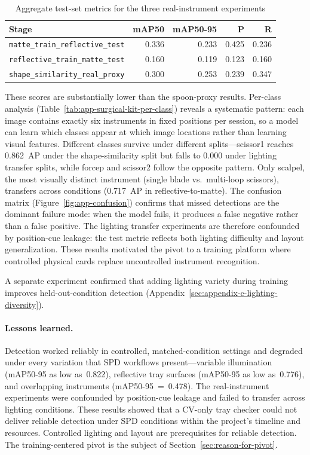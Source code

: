 \documentclass[10pt,a4paper]{article}
\begin{document}
\begin{table}[H]
\centering
\caption{Aggregate test-set metrics for the three real-instrument experiments}
\label{tab:surgical-kit-stage-metrics}
\small\renewcommand{\arraystretch}{1.2}\setlength{\tabcolsep}{4pt}
\begin{tabularx}{\textwidth}{lrrrr}
\hline
Stage & mAP50 & mAP50-95 & P & R \\
\hline
\texttt{matte\_train\_reflective\_test} & 0.336 & 0.233 & 0.425 & 0.236 \\
\texttt{reflective\_train\_matte\_test} & 0.160 & 0.119 & 0.123 & 0.160 \\
\texttt{shape\_similarity\_real\_proxy} & 0.300 & 0.253 & 0.239 & 0.347 \\
\hline
\end{tabularx}
\end{table}

These scores are substantially lower than the spoon-proxy results.
Per-class analysis (Table~\ref{tab:app-surgical-kit-per-class}) reveals
a systematic pattern: each image contains exactly six instruments in fixed
positions per session, so a model can learn which classes appear at which
image locations rather than learning visual features. Different classes
survive under different splits---scissor1 reaches 0.862~AP under the
shape-similarity split but falls to 0.000 under lighting transfer splits,
while forcep and scissor2 follow the opposite pattern. Only scalpel, the
most visually distinct instrument (single blade vs.\ multi-loop scissors),
transfers across conditions (0.717~AP in reflective-to-matte). The
confusion matrix (Figure~\ref{fig:app-confusion}) confirms that missed
detections are the dominant failure mode: when the model fails, it
produces a false negative rather than a false positive. The lighting
transfer experiments are therefore confounded by position-cue leakage:
the test metric reflects both lighting difficulty and layout
generalization. These results motivated the pivot to a training
platform where controlled physical cards replace uncontrolled
instrument recognition.

A separate experiment confirmed that adding lighting variety during
training improves held-out-condition detection
(Appendix~\ref{sec:appendix-c-lighting-diversity}).

\paragraph{Lessons learned.}
\label{sec:boundary-conditions-for-future-cv-work}
Detection worked reliably in controlled, matched-condition settings and degraded under
every variation that SPD workflows present---variable illumination
(mAP50-95 as low as~0.822), reflective tray surfaces (mAP50-95 as low
as~0.776), and overlapping instruments (mAP50-95~=~0.478). The real-instrument
experiments were confounded by position-cue leakage and failed to transfer
across lighting conditions. These results showed that a CV-only tray checker
could not deliver reliable detection under SPD conditions within the project's
timeline and resources.
Controlled lighting and layout are prerequisites for
reliable detection. The training-centered pivot is the subject of
Section~\ref{sec:reason-for-pivot}.
\end{document}
